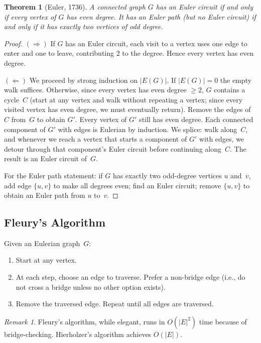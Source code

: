 \documentclass[12pt,a4paper,openany]{book}
\theoremstyle{definition}
\theoremstyle{plain}
\newtheorem{theorem}[definition]{Theorem}
\theoremstyle{remark}
\newtheorem{remark}[definition]{Remark}
\newcommand{\abs}[1]{\left|#1\right|}
\begin{document}
\begin{theorem}[Euler, 1736]
\label{thm:euler-char}
A connected graph $G$ has an Euler circuit if and only if every vertex
of $G$ has even degree.  It has an Euler path (but no Euler circuit) if
and only if it has exactly two vertices of odd degree.
\end{theorem}

\begin{proof}
$(\Rightarrow)$\; If $G$ has an Euler circuit, each visit to a vertex
uses one edge to enter and one to leave, contributing $2$ to the degree.
Hence every vertex has even degree.

$(\Leftarrow)$\; We proceed by strong induction on $\abs{E(G)}$.  If
$\abs{E(G)}=0$ the empty walk suffices.  Otherwise, since every vertex
has even degree $\ge 2$, $G$ contains a cycle~$C$ (start at any vertex
and walk without repeating a vertex; since every visited vertex has even
degree, we must eventually return).  Remove the edges of~$C$ from~$G$
to obtain $G'$.  Every vertex of $G'$ still has even degree.  Each
connected component of $G'$ with edges is Eulerian by induction.  We
splice: walk along~$C$, and whenever we reach a vertex that starts a
component of $G'$ with edges, we detour through that component's Euler
circuit before continuing along~$C$.  The result is an Euler circuit
of~$G$.

For the Euler path statement: if $G$ has exactly two odd-degree vertices
$u$ and~$v$, add edge $\{u,v\}$ to make all degrees even; find an Euler
circuit; remove $\{u,v\}$ to obtain an Euler path from $u$ to~$v$.
\end{proof}

\subsection{Fleury's Algorithm}
\label{ssec:fleury}

Given an Eulerian graph~$G$:
\begin{enumerate}
  \item Start at any vertex.
  \item At each step, choose an edge to traverse.  Prefer a non-bridge
        edge (i.e., do not cross a bridge unless no other option exists).
  \item Remove the traversed edge.  Repeat until all edges are traversed.
\end{enumerate}

\begin{remark}
Fleury's algorithm, while elegant, runs in $O(\abs{E}^2)$ time because
of bridge-checking.  Hierholzer's algorithm achieves $O(\abs{E})$.
\end{remark}
\end{document}

